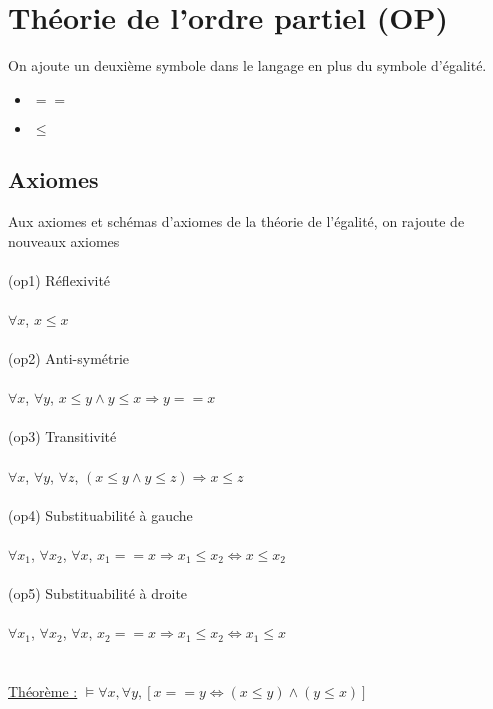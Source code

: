 \section{Théorie de l'ordre partiel (OP)}
On ajoute un deuxième symbole dans le langage en plus du symbole d'égalité.
\begin{itemize}
	\item $==$
	\item $\leq $
\end{itemize}

\subsection{Axiomes} 
Aux axiomes et schémas d'axiomes de la théorie de l'égalité, on rajoute de nouveaux axiomes\\ \\
(op1) Réflexivité \\ \\$\forall x$, $x\leq x$\\ \\
(op2) Anti-symétrie \\ \\$\forall x$, $\forall y$, $ x\leq y \land y\leq x\Rightarrow y==x$\\ \\
(op3) Transitivité \\ \\$\forall x$, $\forall y$, $\forall z$, $(x\leq y \land y\leq z) \Rightarrow x\leq z$\\ \\
(op4) Substituabilité à gauche \\ \\$\forall x_{1}$, $\forall x_{2}$, $\forall x$,  $x_{1}==x \Rightarrow x_{1}\leq x_{2} \Leftrightarrow x \leq x_{2}$\\ \\
(op5) Substituabilité à droite \\ \\$\forall x_{1}$, $\forall x_{2}$, $\forall x$,  $x_{2}==x \Rightarrow x_{1}\leq x_{2} \Leftrightarrow x_{1} \leq x$\\ \\ \\
\underline{Théorème :} $\models \forall x, \forall y,  [x==y \Leftrightarrow (x\leq y)\land (y \leq x)] $
